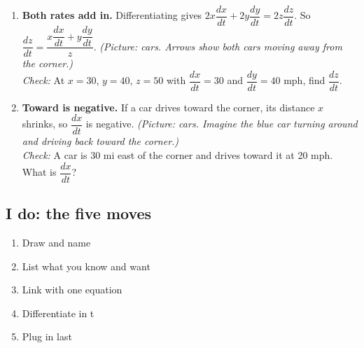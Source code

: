 \documentclass[11pt]{article}
\begin{document}
\begin{enumerate}
\item \textbf{Both rates add in.} Differentiating gives $2x\dfrac{dx}{dt}+2y\dfrac{dy}{dt}=2z\dfrac{dz}{dt}$. So $\dfrac{dz}{dt}=\dfrac{x\dfrac{dx}{dt}+y\dfrac{dy}{dt}}{z}$. \textit{(Picture: cars. Arrows show both cars moving away from the corner.)}\\ \textit{Check:} At $x=30$, $y=40$, $z=50$ with $\dfrac{dx}{dt}=30$ and $\dfrac{dy}{dt}=40$ mph, find $\dfrac{dz}{dt}$. 
\item \textbf{Toward is negative.} If a car drives toward the corner, its distance $x$ shrinks, so $\dfrac{dx}{dt}$ is negative. \textit{(Picture: cars. Imagine the blue car turning around and driving back toward the corner.)}\\ \textit{Check:} A car is 30 mi east of the corner and drives toward it at 20 mph. What is $\dfrac{dx}{dt}$? 
\end{enumerate}
\subsection*{I do: the five moves}\begin{enumerate}\item Draw and name
\item List what you know and want
\item Link with one equation
\item Differentiate in t
\item Plug in last\end{enumerate}
\end{document}
